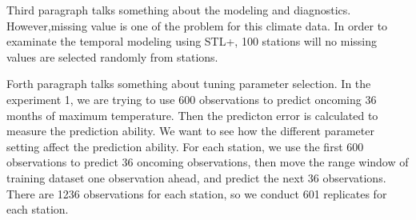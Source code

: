 Third paragraph talks something about the modeling and diagnostics.
However,missing value is one of the problem for this climate data. In order to examinate the 
temporal modeling using STL+, 100 stations will no missing values are selected randomly from 
stations. 

Forth paragraph talks something about tuning parameter selection.
In the experiment 1, we are trying to use 600 observations to predict oncoming 36 months of 
maximum temperature. Then the predicton error is calculated to measure the prediction ability. 
We want to see how the different parameter setting affect the prediction ability. For each station,
we use the first 600 observations to predict 36 oncoming observations, then move the range window 
of training dataset one observation ahead, and predict the next 36 observations. There are 1236 
observations for each station, so we conduct 601 replicates for each station.

